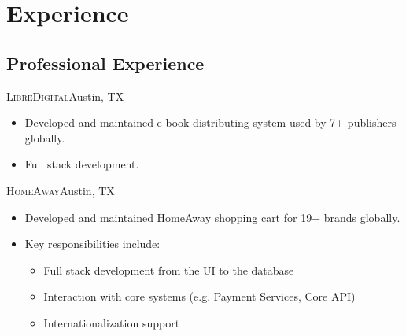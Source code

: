 \documentclass[11pt,letterpaper,sans]{moderncv}
\begin{document}

\section{Experience}

  \subsection{Professional Experience}

     {\textsc{LibreDigital}}{Austin, TX}{}
     {\begin{itemize}
         \item Developed and maintained e-book distributing system
               used by 7+ publishers globally.
         \item Full stack development.
     \end{itemize}}

     {\textsc{HomeAway}}{Austin, TX}{}
     {\begin{itemize}
         \item Developed and maintained HomeAway shopping cart for 19+
               brands globally.
         \item Key responsibilities include:
               {\begin{itemize}
                   \item Full stack development from the UI to the
                         database
                   \item Interaction with core systems (e.g. Payment
                         Services, Core API)
                   \item Internationalization support
                \end{itemize}}
     \end{itemize}}
\end{document}
